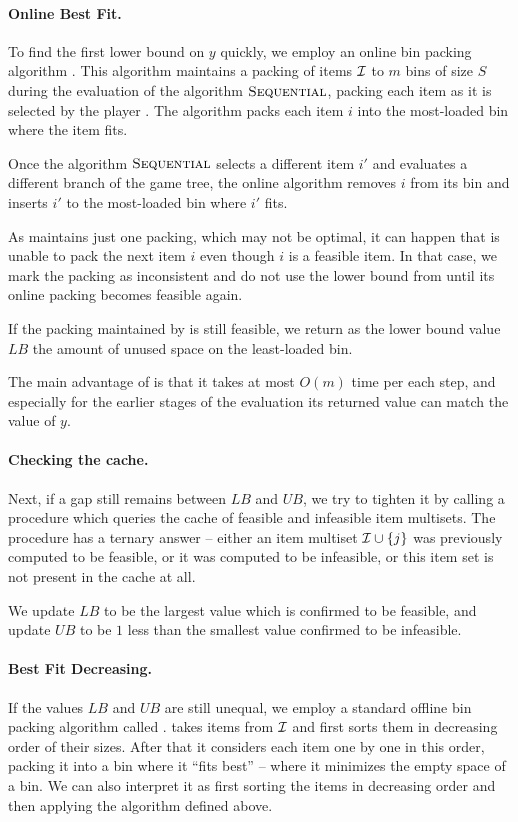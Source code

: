 \paragraph{Online Best Fit.} To find the first lower bound on $y$ quickly, we
employ an online bin packing algorithm \obf. This algorithm maintains
a packing of items ${\mathcal I}$ to $m$ bins of size $S$ during the
evaluation of the algorithm $\textsc{Sequential}$, packing each item as it is
selected by the player \adversary. The algorithm \obf packs each item
$i$ into the most-loaded bin where the item fits.

Once the algorithm $\textsc{Sequential}$ selects a different item $i'$ and
evaluates a different branch of the game tree, the online algorithm
removes $i$ from its bin and inserts $i'$ to the most-loaded bin
where $i'$ fits.

As \obf maintains just one packing, which may not be optimal, it can
happen that \obf is unable to pack the next item $i$ even though $i$
is a feasible item. In that case, we mark the packing as inconsistent
and do not use the lower bound from \obf until its online packing
becomes feasible again.

If the packing maintained by \obf is still feasible, we return as the
lower bound value $LB$ the amount of unused space on the least-loaded
bin.

The main advantage of \obf is that it takes at most $O(m)$ time per
each step, and especially for the earlier stages of the evaluation its
returned value can match the value of $y$.

\paragraph{Checking the cache.} Next, if a gap still remains between
$LB$ and $UB$, we try to tighten it by calling a procedure \Query
which queries the cache of feasible and infeasible item multisets.
The procedure has a ternary answer -- either an item multiset ${\mathcal I}
\cup \{j\}$ was previously computed to be feasible, or it was computed
to be infeasible, or this item set is not present in the cache at all.

We update $LB$ to be the largest value which is confirmed to be
feasible, and update $UB$ to be $1$ less than the smallest value
confirmed to be infeasible.

\paragraph{Best Fit Decreasing.} If the values $LB$ and $UB$ are still
unequal, we employ a standard offline bin packing algorithm called
\bfd. \bfd takes items from ${\mathcal I}$ and first sorts them in decreasing
order of their sizes. After that it considers each item one by one in
this order, packing it into a bin where it ``fits best'' -- where it
minimizes the empty space of a bin. We can also interpret it as first
sorting the items in decreasing order and then applying the algorithm
\obf defined above.

